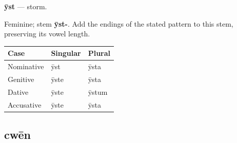 \par\begin{minipage}{\linewidth}\raggedright
\textbf{ȳst} — storm.

Feminine; stem \textbf{ȳst-}. Add the endings of the stated pattern to this stem, preserving its vowel length.

\par\begingroup
\fontsize{10.5}{13.2}\selectfont
\setlength{\LTleft}{0pt}\setlength{\LTright}{\fill}
\noindent
\begin{tabular}{@{}>{\raggedright\arraybackslash}p{39.46mm}>{\raggedright\arraybackslash}p{39.46mm}>{\raggedright\arraybackslash}p{39.46mm}@{}}
\toprule
\textbf{Case} & \textbf{Singular} & \textbf{Plural} \\
\midrule
Nominative & ȳst & ȳsta \\
Genitive & ȳste & ȳsta \\
Dative & ȳste & ȳstum \\
Accusative & ȳste & ȳsta \\
\bottomrule
\end{tabular}
\par\endgroup

\end{minipage}\par
{}
\subsection*{cwēn}

